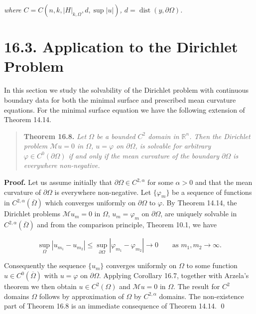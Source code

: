 \noindent \emph{where $C = C(n, k, |H|_{k,\Omega}, d, \sup |u|)$, $d = \operatorname{dist}(y,\partial\Omega)$.}

\bigskip

\section*{16.3. Application to the Dirichlet Problem}

In this section we study the solvability of the Dirichlet problem with continuous boundary data for both the minimal surface and prescribed mean curvature equations. For the minimal surface equation we have the following extension of Theorem 14.14.

\begin{quote}
\textbf{Theorem 16.8.} \emph{Let $\Omega$ be a bounded $C^2$ domain in $\mathbb{R}^n$. Then the Dirichlet problem $\mathcal{M}u=0$ in $\Omega$, $u=\varphi$ on $\partial\Omega$, is solvable for arbitrary $\varphi \in C^0(\partial\Omega)$ if and only if the mean curvature of the boundary $\partial\Omega$ is everywhere non-negative.}
\end{quote}

\noindent \textbf{Proof.} Let us assume initially that $\partial\Omega \in C^{2,\alpha}$ for some $\alpha > 0$ and that the mean curvature of $\partial\Omega$ is everywhere non-negative. Let $\{\varphi_m\}$ be a sequence of functions in $C^{2,\alpha}(\overline{\Omega})$ which converges uniformly on $\partial\Omega$ to $\varphi$. By Theorem 14.14, the Dirichlet problems $\mathcal{M}u_m=0$ in $\Omega$, $u_m=\varphi_m$ on $\partial\Omega$, are uniquely solvable in $C^{2,\alpha}(\overline{\Omega})$ and from the comparison principle, Theorem 10.1, we have

\begin{equation*}
\sup_{\Omega} |u_{m_1} - u_{m_2}| \leq \sup_{\partial\Omega} |\varphi_{m_1} - \varphi_{m_2}| \to 0 \qquad \text{as } m_1, m_2 \to \infty.
\end{equation*}

Consequently the sequence $\{u_m\}$ converges uniformly on $\Omega$ to some function $u \in C^0(\overline{\Omega})$ with $u = \varphi$ on $\partial\Omega$. Applying Corollary 16.7, together with Arzela's theorem we then obtain $u \in C^2(\Omega)$ and $\mathcal{M}u=0$ in $\Omega$. The result for $C^2$ domains $\Omega$ follows by approximation of $\Omega$ by $C^{2,\alpha}$ domains. The non-existence part of Theorem 16.8 is an immediate consequence of Theorem 14.14. \qed


